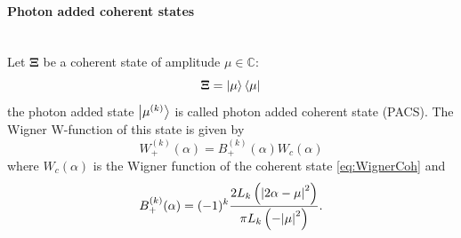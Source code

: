         \paragraph{Photon added coherent states}\mbox{}\\
        Let $\pmb{\Xi}$ be a coherent state of amplitude $\mu \in \mathbb{C}$: 
        \begin{equation*}
            \pmb{\Xi}=\ket{\mu}\bra{\mu}
        \end{equation*}
        the photon added state $\ket{\mu^{(k)}}$ is called photon added coherent state
        (PACS).
        The Wigner W-function of this state is given by \cite{tesiGuerrini}
        \begin{equation}
            W_+^{(k)}(\alpha) = B_+^{(k)}(\alpha) W_c(\alpha)
        \end{equation}
        where $W_c(\alpha)$ is the Wigner function of the coherent state \ref{eq:WignerCoh} and
        \begin{equation*}
            B_+^{(k)}(\alpha) = (-1)^k \frac{2 L_k \left( \absolutevalue{2\alpha-\mu}^2 \right)}
            {\pi L_k \left(-\absolutevalue{\mu}^2 \right)}.
        \end{equation*}

